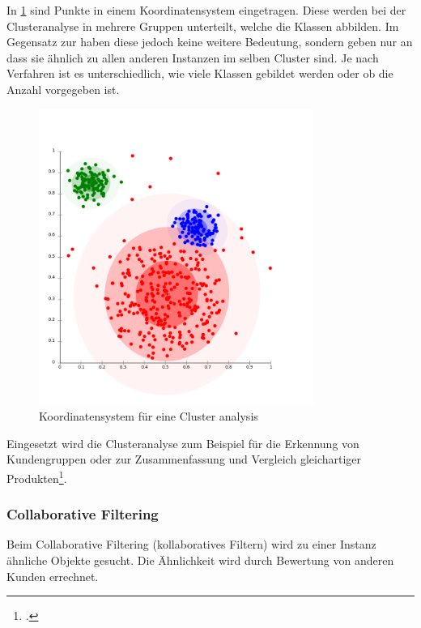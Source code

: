 In \cref{fig:recherche:dataminingtechniken:disziplinen:clusteranalysis} sind Punkte in einem Koordinatensystem eingetragen. Diese werden bei der Clusteranalyse in mehrere Gruppen unterteilt, welche die Klassen abbilden. Im Gegensatz zur  haben diese jedoch keine weitere Bedeutung, sondern geben nur an dass sie ähnlich zu allen anderen Instanzen im selben Cluster sind. Je nach Verfahren ist es unterschiedlich, wie viele Klassen gebildet werden oder ob die Anzahl vorgegeben ist.
\begin{figure}[H]
	\RawFloats
	\centering
	\includegraphics[width=0.8\textwidth]{images/clusteranalysis.png}
	\caption{Koordinatensystem für eine Cluster analysis}
	\label{fig:recherche:dataminingtechniken:disziplinen:clusteranalysis}
\end{figure}

Eingesetzt wird die Clusteranalyse zum Beispiel für die Erkennung von Kundengruppen oder zur  Zusammenfassung und Vergleich gleichartiger Produkten\footcite{einsatzgebiet_clusteranalyse}.


\subsubsection{Collaborative Filtering}
\label{sec:recherche:dataminingtechniken:disziplinen:collaborativefiltering}
Beim Collaborative Filtering (kollaboratives Filtern) wird zu einer Instanz ähnliche Objekte gesucht. Die Ähnlichkeit wird durch Bewertung von anderen Kunden errechnet. 

